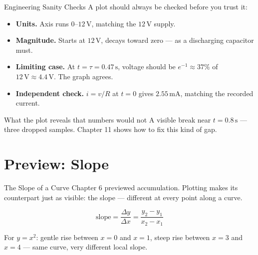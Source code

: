 \documentclass[9pt,aspectratio=169,xcolor=table]{beamer}
\begin{document}
\begin{frame}{Engineering Sanity Checks}
    \leavevmode
    \small
    A plot should always be checked before you trust it:

    \vspace{2mm}
    \begin{itemize}
        \item \textbf{Units.} Axis runs $0$--$12\,\text{V}$, matching
              the $12\,\text{V}$ supply.
        \item \textbf{Magnitude.} Starts at $12\,\text{V}$, decays
              toward zero --- as a discharging capacitor must.
        \item \textbf{Limiting case.} At $t=\tau=0.47\,\text{s}$,
              voltage should be $e^{-1}\approx 37\%$ of $12\,\text{V}
              \approx 4.4\,\text{V}$. The graph agrees.
        \item \textbf{Independent check.} $i = v/R$ at $t=0$ gives
              $2.55\,\text{mA}$, matching the recorded current.
    \end{itemize}

    \vspace{2mm}
    \begin{alertblock}{What the plot reveals that numbers would not}
        A visible break near $t=0.8\,\text{s}$ --- three dropped
        samples. Chapter 11 shows how to fix this kind of gap.
    \end{alertblock}
\end{frame}

\section{Preview: Slope}

\begin{frame}{The Slope of a Curve}
    \leavevmode
    Chapter 6 previewed \alert{accumulation}. Plotting makes its
    counterpart just as visible: the \alert{slope} --- different at
    every point along a curve.

    \vspace{2mm}
    \[
    \text{slope} = \frac{\Delta y}{\Delta x} = \frac{y_2-y_1}{x_2-x_1}
    \]

    \vspace{2mm}
    For $y=x^2$: gentle rise between $x=0$ and $x=1$, steep rise between
    $x=3$ and $x=4$ --- same curve, very different local slope.
\end{frame}
\end{document}
